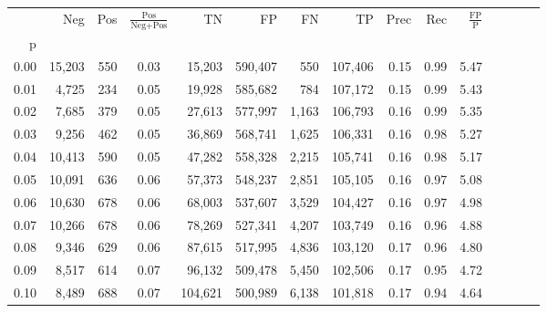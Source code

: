 \begin{tabular}{rrrcrrrrrrrrrrr}
\toprule
{} &     Neg &    Pos & $\frac{\text{Pos}}{\text{Neg}+\text{Pos}}$ &       TN &       FP &       FN &       TP &  Prec &   Rec & $\frac{\text{FP}}{\text{P}}$ \\
p    &         &        &                                            &          &          &          &          &       &       &                              \\
\midrule
0.00 &  15,203 &    550 &                                       0.03 &   15,203 &  590,407 &      550 &  107,406 &  0.15 &  0.99 &                         5.47 \\
0.01 &   4,725 &    234 &                                       0.05 &   19,928 &  585,682 &      784 &  107,172 &  0.15 &  0.99 &                         5.43 \\
0.02 &   7,685 &    379 &                                       0.05 &   27,613 &  577,997 &    1,163 &  106,793 &  0.16 &  0.99 &                         5.35 \\
0.03 &   9,256 &    462 &                                       0.05 &   36,869 &  568,741 &    1,625 &  106,331 &  0.16 &  0.98 &                         5.27 \\
0.04 &  10,413 &    590 &                                       0.05 &   47,282 &  558,328 &    2,215 &  105,741 &  0.16 &  0.98 &                         5.17 \\
0.05 &  10,091 &    636 &                                       0.06 &   57,373 &  548,237 &    2,851 &  105,105 &  0.16 &  0.97 &                         5.08 \\
0.06 &  10,630 &    678 &                                       0.06 &   68,003 &  537,607 &    3,529 &  104,427 &  0.16 &  0.97 &                         4.98 \\
0.07 &  10,266 &    678 &                                       0.06 &   78,269 &  527,341 &    4,207 &  103,749 &  0.16 &  0.96 &                         4.88 \\
0.08 &   9,346 &    629 &                                       0.06 &   87,615 &  517,995 &    4,836 &  103,120 &  0.17 &  0.96 &                         4.80 \\
0.09 &   8,517 &    614 &                                       0.07 &   96,132 &  509,478 &    5,450 &  102,506 &  0.17 &  0.95 &                         4.72 \\
0.10 &   8,489 &    688 &                                       0.07 &  104,621 &  500,989 &    6,138 &  101,818 &  0.17 &  0.94 &                         4.64 \\

\end{tabular}
